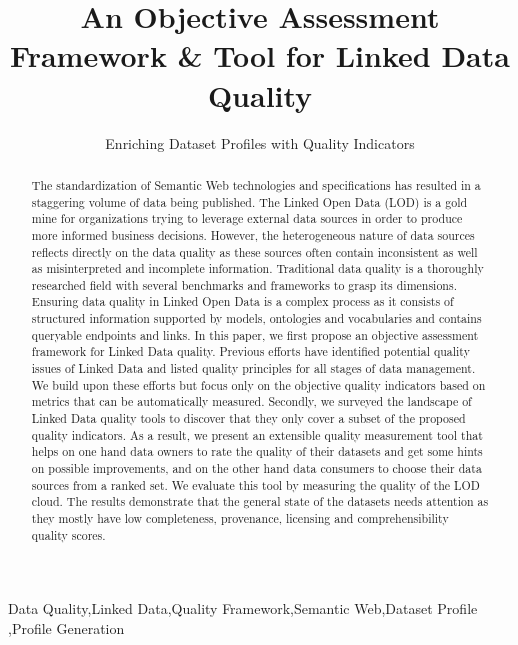 \documentclass[onecolumn, crcready]{../../Util/LaTEX/iosart2c}
\begin{document}
\begin{frontmatter}

\title{An Objective Assessment Framework \& Tool for Linked Data Quality}
\subtitle{Enriching Dataset Profiles with Quality Indicators}


\begin{abstract}
The standardization of Semantic Web technologies and specifications has resulted in a staggering volume of data being published. The Linked Open Data (LOD) is a gold mine for organizations trying to leverage external data sources in order to produce more informed business decisions. However, the heterogeneous nature of data sources reflects directly on the data quality as these sources often contain inconsistent as well as misinterpreted and incomplete information. Traditional data quality is a thoroughly researched field with several benchmarks and frameworks to grasp its dimensions. Ensuring data quality in Linked Open Data is a complex process as it consists of structured information supported by models, ontologies and vocabularies and contains queryable endpoints and links. In this paper, we first propose an objective assessment framework for Linked Data quality. Previous efforts have identified potential quality issues of Linked Data and listed quality principles for all stages of data management. We build upon these efforts but focus only on the objective quality indicators based on metrics that can be automatically measured. Secondly, we surveyed the landscape of Linked Data quality tools to discover that they only cover a subset of the proposed quality indicators. As a result, we present an extensible quality measurement tool that helps on one hand data owners to rate the quality of their datasets and get some hints on possible improvements, and on the other hand data consumers to choose their data sources from a ranked set. We evaluate this tool by measuring the quality of the LOD cloud. The results demonstrate that the general state of the datasets needs attention as they mostly have low completeness, provenance, licensing and comprehensibility quality scores.
\end{abstract}

\begin{keyword}
Data Quality\sep Linked Data\sep Quality Framework\sep Semantic Web\sep Dataset Profile \sep Profile Generation
\end{keyword}
\end{frontmatter}
\end{document}
